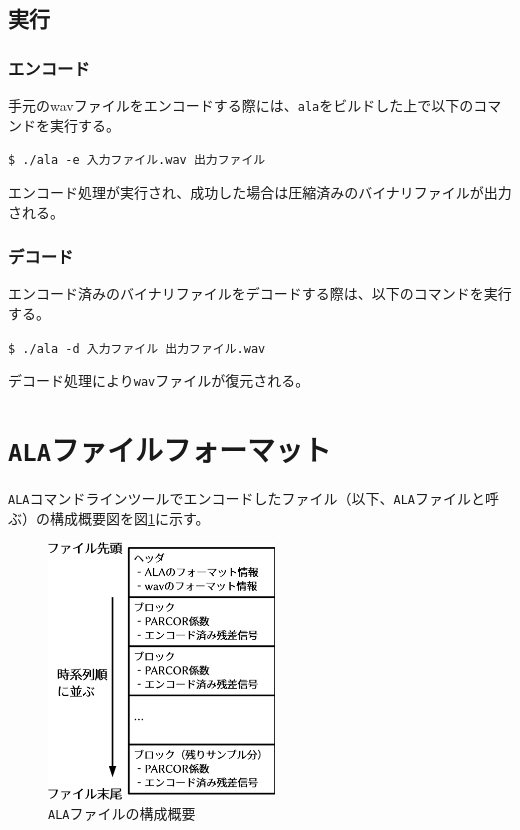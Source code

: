 \documentclass[uplatex,dvipdfmx,b5j,10pt]{jsbook}
\theoremstyle{definition}
\begin{document}
\subsection{実行}
\subsubsection{エンコード} 手元のwavファイルをエンコードする際には、\texttt{ala}をビルドした上で以下のコマンドを実行する。
\begin{flushleft}
  \texttt{\$ ./ala -e 入力ファイル.wav 出力ファイル}
\end{flushleft}

エンコード処理が実行され、成功した場合は圧縮済みのバイナリファイルが出力される。
\subsubsection{デコード} エンコード済みのバイナリファイルをデコードする際は、以下のコマンドを実行する。
\begin{flushleft}
  \texttt{\$ ./ala -d 入力ファイル 出力ファイル.wav}
\end{flushleft}
デコード処理により\texttt{wav}ファイルが復元される。

\section{\texttt{ALA}ファイルフォーマット}

\texttt{ALA}コマンドラインツールでエンコードしたファイル（以下、\texttt{ALA}ファイルと呼ぶ）の構成概要図を図\ref{ala_file_format}に示す。
\begin{figure}[htbp]
  \begin{center}
    \includegraphics[width=60mm]{./figs/ala_file_format.png} 
    \caption{\texttt{ALA}ファイルの構成概要} \label{ala_file_format}
  \end{center}
\end{figure}
\end{document}
